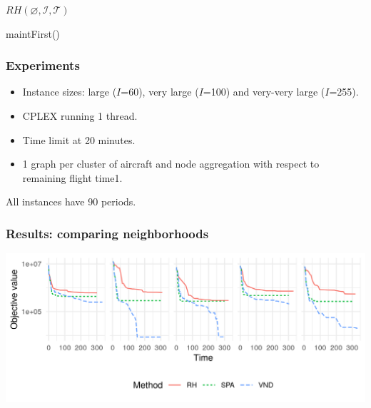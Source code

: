 \begin{frame}
  $RH(\varnothing, \mathcal{I}, \mathcal{T})$ \\

  maintFirst()
  \pause

\end{frame}

\begin{frame}
\frametitle{\textbf{Experiments}}
  
  \begin{itemize}

  \item Instance sizes: large ($I$=60), very large ($I$=100) and very-very large ($I$=255).
  \item CPLEX running 1 thread.
  \item Time limit at 20 minutes.
  \item 1 graph per cluster of aircraft and node aggregation with respect to remaining flight time1.
  \end{itemize}

  \pause

  All instances have 90 periods.
\end{frame}

\begin{frame}
\frametitle{\textbf{Results: comparing neighborhoods}}
  \includegraphics[width=\linewidth]{images/compare_neighbors.png}
\end{frame}

